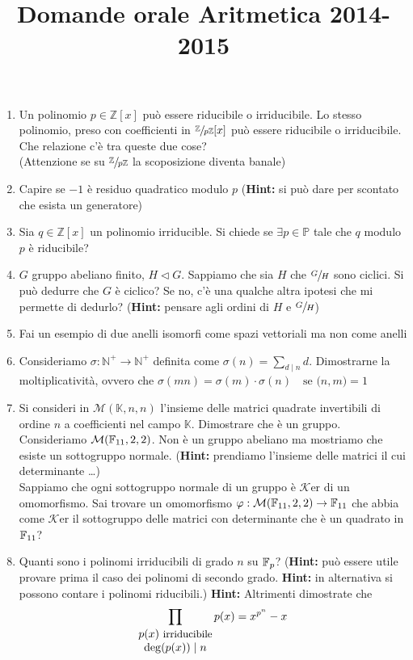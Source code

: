 \documentclass[a4paper,11pt]{article}
\title{Domande orale Aritmetica 2014-2015}
\author{}
\newcommand{\su}[2]{\sfrac{#1}{#2}}
\newcommand{\PP}{\mathbb{P}}
\newcommand{\NN}{\mathbb{N}}
\newcommand{\KK}{\mathbb{K}}
\newcommand{\Nplus}{\NN^{+}}
\newcommand{\Mtr}[3]{\mathcal{M}(#1, #2, #3)}
\newcommand{\Zx}{\mathbb{Z}[x]}
\newcommand{\Zp}{\su{\mathbb{Z}}{p\mathbb{Z}}}
\newcommand{\Zpx}{\Zp [x]}
\newcommand{\Hint}{{\bf Hint: }}
\newcommand{\Ker}{\mathcal{K}\mbox{er} }
\newcommand{\MCD}[2]{\mathcal{(} #1 \mathcal{,} #2 \mathcal{)}}
\begin{document}
\maketitle

\begin{enumerate}
\item Un polinomio $p \in \Zx$ pu\`o essere riducibile o irriducibile. Lo stesso polinomio, preso con coefficienti in $\Zpx$ pu\`o essere riducibile o irriducibile. Che relazione c'\`e tra queste due cose? \\ (Attenzione se su $\Zp$ la scoposizione diventa banale)
\item Capire se $-1$ \`e residuo quadratico modulo $p$ (\Hint si pu\`o dare per scontato che esista un generatore)
\item Sia $q \in \Zx$ un polinomio irriducible. Si chiede se $\exists p \in \PP$ tale che $q$ modulo $p$ \`e riducibile?
\item $G$ gruppo abeliano finito, $H \lhd G$. Sappiamo che sia $H$ che $\su{G}{H}$ sono ciclici. Si pu\`o dedurre che $G$ \`e ciclico? Se no, c'\`e una qualche altra ipotesi che mi permette di dedurlo? (\Hint pensare agli ordini di $H$ e $\su{G}{H}$)
\item Fai un esempio di due anelli isomorfi come spazi vettoriali ma non come anelli
\item Consideriamo $\sigma : \Nplus \rightarrow \Nplus$ definita come $\sigma(n) = \sum_{d \mid n} d$. Dimostrarne la moltiplicativit\`a, ovvero che $\sigma(mn) = \sigma(m)\cdot\sigma(n) \quad \mbox{se } \MCD{n}{m}=1$
\item Si consideri in $\Mtr{\KK}{n}{n}$ l'insieme delle matrici quadrate invertibili di ordine $n$ a coefficienti nel campo $\KK$. Dimostrare che è un gruppo. \\ Consideriamo $\Mtr{\FF{11}}{2}{2}$. Non \`e un gruppo abeliano ma mostriamo che esiste un sottogruppo normale. (\Hint prendiamo l'insieme delle matrici il cui determinante \ldots) \\ Sappiamo che ogni sottogruppo normale di un gruppo \`e $\Ker$ di un omomorfismo. Sai trovare un omomorfismo $\varphi : \Mtr{\FF{11}}{2}{2}  \rightarrow \FF{11}$ che abbia come $\Ker$ il sottogruppo delle matrici con determinante che è un quadrato in $\FF{11}$?
\item Quanti sono i polinomi irriducibili di grado $n$ su $\FF{p}$? (\Hint pu\`o essere utile provare prima il caso dei polinomi di secondo grado. \Hint in alternativa si possono contare i polinomi riducibili.) \Hint Altrimenti dimostrate che $$\prod_{\begin{matrix} p(x) \mbox{ \small irriducibile} \\ \deg(p(x)) \mid n \end{matrix}} p(x) = x^{p^n}-x$$

\end{enumerate}
\end{document}
